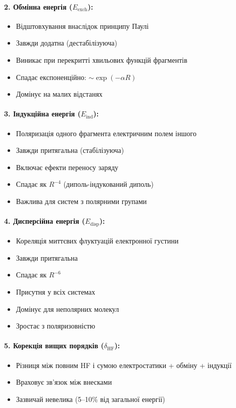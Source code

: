 \paragraph{2. Обмінна енергія (\(E_{\text{exch}}\)):}
\begin{itemize}
    \item Відштовхування внаслідок принципу Паулі
    \item Завжди додатна (дестабілізуюча)
    \item Виникає при перекритті хвильових функцій фрагментів
    \item Спадає експоненційно: \(\sim \exp(-\alpha R)\)
    \item Домінує на малих відстанях
\end{itemize}

\paragraph{3. Індукційна енергія (\(E_{\text{ind}}\)):}
\begin{itemize}
    \item Поляризація одного фрагмента електричним полем іншого
    \item Завжди притягальна (стабілізуюча)
    \item Включає ефекти переносу заряду
    \item Спадає як \(R^{-4}\) (диполь-індукований диполь)
    \item Важлива для систем з полярними групами
\end{itemize}

\paragraph{4. Дисперсійна енергія (\(E_{\text{disp}}\)):}
\begin{itemize}
    \item Кореляція миттєвих флуктуацій електронної густини
    \item Завжди притягальна
    \item Спадає як \(R^{-6}\)
    \item Присутня у всіх системах
    \item Домінує для неполярних молекул
    \item Зростає з поляризовністю
\end{itemize}

\paragraph{5. Корекція вищих порядків (\(\delta_{\text{HF}}\)):}
\begin{itemize}
    \item Різниця між повним HF і сумою електростатики + обміну + індукції
    \item Враховує зв'язок між внесками
    \item Зазвичай невелика (5--10\% від загальної енергії)
\end{itemize}

